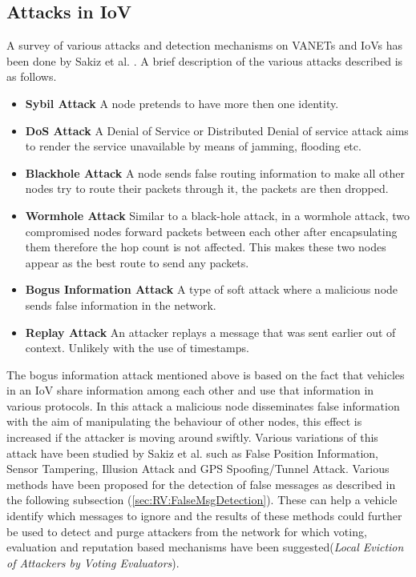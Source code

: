 \documentclass[journal]{IEEEtran}
\begin{document}
\subsection{Attacks in IoV}
\label{sec:RV:attacks}
A survey of various attacks and detection mechanisms on VANETs and IoVs has been done by Sakiz et al. \cite{c:AttacksSurvey}. A brief description of the various attacks described is as follows.
\begin{itemize}
	\item \textbf{Sybil Attack} A node pretends to have more then one identity.
	\item \textbf{DoS Attack} A Denial of Service or Distributed Denial of service attack aims to render the service unavailable by means of jamming, flooding etc.
	\item \textbf{Blackhole Attack} A node sends false routing information to make all other nodes try to route their packets through it, the packets are then dropped.
	\item \textbf{Wormhole Attack} Similar to a black-hole attack, in a wormhole attack, two compromised nodes forward packets between each other after encapsulating them therefore the hop count is not affected. This makes these two nodes appear as the best route to send any packets.
	\item \textbf{Bogus Information Attack} A type of soft attack where a malicious node sends false information in the network.
	\item \textbf{Replay Attack} An attacker replays a message that was sent earlier out of context. Unlikely with the use of timestamps.
\end{itemize}
The bogus information attack mentioned above is based on the fact that vehicles in an IoV share information among each other and use that information in various protocols. In this attack a malicious node disseminates false information with the aim of manipulating the behaviour of other nodes, this effect is increased if the attacker is moving around swiftly\cite{c:MotorwayAttack}. Various variations of this attack have been studied by Sakiz et al.\cite{c:AttacksSurvey} such as False Position Information\cite{c:FalsePositionInformation}, Sensor Tampering, Illusion Attack\cite{c:IllusionAttack} and GPS Spoofing/Tunnel Attack\cite{c:TunnelAttack}. Various methods have been proposed for the detection of false messages as described in the following subsection (\ref{sec:RV:FalseMsgDetection}). These can help a vehicle identify which messages to ignore and the results of these methods could further be used to detect and purge attackers from the network for which voting, evaluation and reputation based mechanisms have been suggested\cite{c:MDSandLEAVE}(\textit{Local Eviction of Attackers by Voting Evaluators})\cite{c:messagefilterCoE}. 
\end{document}
